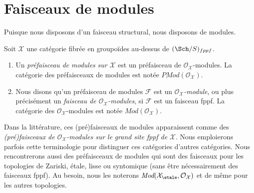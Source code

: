 \section{Faisceaux de modules}
\label{section-modules}

\noindent
Puisque nous disposons d'un faisceau structural, nous disposons de modules.

\begin{definition}
\label{definition-modules}
Soit $\mathcal{X}$ une catégorie fibrée en groupoïdes au-dessus de
$(\Sch/S)_{fppf}$.
\begin{enumerate}
\item Un {\it préfaisceau de modules sur $\mathcal{X}$} est un
préfaisceau de $\mathcal{O}_\mathcal{X}$-modules. La catégorie des
préfaisceaux de modules est notée $\textit{PMod}(\mathcal{O}_\mathcal{X})$.
\item Nous disons qu'un préfaisceau de modules $\mathcal{F}$ est un
{\it $\mathcal{O}_\mathcal{X}$-module}, ou plus précisément un
{\it faisceau de $\mathcal{O}_\mathcal{X}$-modules}, si $\mathcal{F}$
est un faisceau fppf. La catégorie des $\mathcal{O}_\mathcal{X}$-modules
est notée $\textit{Mod}(\mathcal{O}_\mathcal{X})$.
\end{enumerate}
\end{definition}

\noindent
Dans la littérature, ces (pré)faisceaux de modules apparaissent comme des {\it (pré)faisceaux
de $\mathcal{O}_\mathcal{X}$-modules sur le grand site fppf de $\mathcal{X}$}.
Nous emploierons parfois cette terminologie pour distinguer ces
catégories d'autres catégories. Nous rencontrerons aussi des préfaisceaux de modules qui
sont des faisceaux pour les topologies de Zariski, étale, lisse ou syntomique
(sans être nécessairement des faisceaux fppf). Au besoin, nous les noterons
$\textit{Mod}(\mathcal{X}_\etale, \mathcal{O}_\mathcal{X})$
et de même pour les autres topologies.

